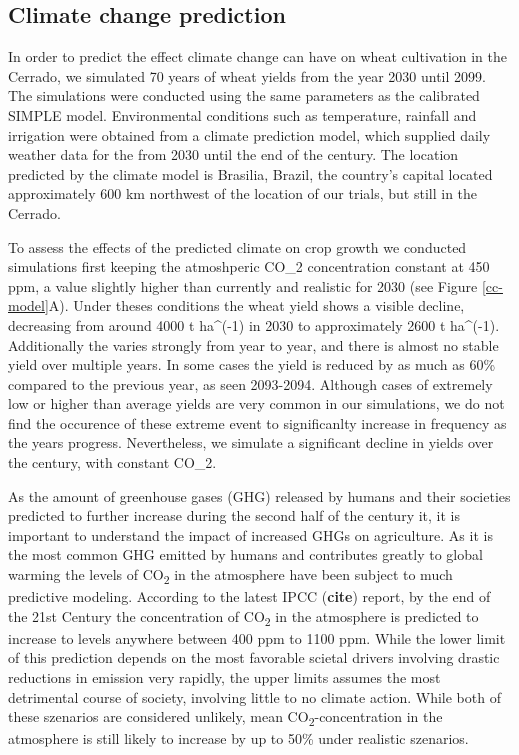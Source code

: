 \documentclass[11pt]{article}
\begin{document}
\subsection{Climate change prediction}
\label{sec:org102f36a}
In order to predict the effect climate change can have on wheat cultivation in the Cerrado, we simulated 70 years of wheat yields from the year 2030 until 2099. The simulations were conducted using the same parameters as the calibrated SIMPLE model. Environmental conditions such as temperature, rainfall and irrigation were obtained from a climate prediction model, which supplied daily weather data for the from 2030 until the end of the century. The location predicted by the climate model is Brasilia, Brazil, the country's capital located approximately 600 km northwest of the location of our trials, but still in the Cerrado.

To assess the effects of the predicted climate on crop growth we conducted simulations first keeping the atmoshperic CO\_2 concentration constant at 450 ppm, a value slightly higher than currently and realistic for 2030 (see Figure \ref{cc-model}A). Under theses conditions the wheat yield shows a visible decline, decreasing from around 4000 t ha\^{}(-1) in 2030 to approximately 2600 t ha\^{}(-1). Additionally the varies strongly from year to year, and there is almost no stable yield over multiple years. In some cases the yield is reduced by as much as 60\% compared to the previous year, as seen 2093-2094. Although cases of extremely low or higher than average yields are very common in our simulations, we do not find the occurence of these extreme event to significanlty increase in frequency as the years progress. Nevertheless, we simulate a significant decline in yields over the century, with constant CO\_2.

As the amount of greenhouse gases (GHG) released by humans and their societies predicted to further increase during the second half of the century it, it is important to understand the impact of increased GHGs on agriculture. As it is the most common GHG emitted by humans and contributes greatly to global warming the levels of CO\textsubscript{2} in the atmosphere have been subject to much predictive modeling. According to the latest IPCC (\textbf{cite}) report, by the end of the 21st Century the concentration of CO\textsubscript{2} in the atmosphere is predicted to increase to levels anywhere between 400 ppm to 1100 ppm. While the lower limit of this prediction depends on the most favorable scietal drivers involving drastic reductions in emission very rapidly, the upper limits assumes the most detrimental course of society, involving little to no climate action. While both of these szenarios are considered unlikely, mean CO\textsubscript{2}-concentration in the atmosphere is still likely to increase by up to 50\% under realistic szenarios.
\end{document}
